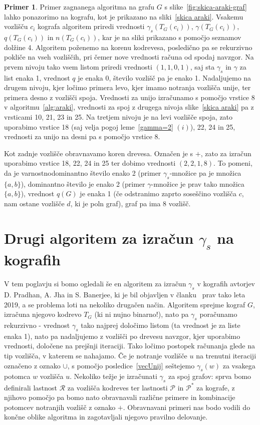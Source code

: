 \documentclass[12pt,a4paper,twoside]{article}
\theoremstyle{definition} %
\newtheorem{primer}[definicija]{Primer}
\theoremstyle{plain} %
\numberwithin{equation}{section}  %
\begin{document}
\begin{primer}
Primer zagnanega algoritma na grafu $G$ s slike~\ref{fig:skica-araki-graf} lahko ponazorimo na kografu, kot je prikazano na sliki~\ref{skica araki}. Vsakemu vozlišču $c_i$ kografa algoritem priredi vrednosti $\gamma_s(T_G(c_i))$, $\gamma(T_G(c_i))$, $q(T_G(c_i))$ in $n(T_G(c_i))$, kar je na sliki prikazano s pomočjo seznamov dolžine 4. Algoritem poženemo na korenu kodrevesa, posledično pa se rekurzivno pokliče na vseh vozliščih, pri čemer nove vrednosti računa od spodaj navzgor. Na prvem nivoju tako vsem listom priredi vrednosti $(1,1,0,1)$, saj sta $\gamma_s$ in $\gamma$ za list enaka 1, vrednost $q$ je enaka 0, število vozlišč pa je enako 1. Nadaljujemo na drugem nivoju, kjer ločimo primera levo, kjer imamo notranja vozlišča unije, ter primera desno z vozlišči spoja. Vrednosti za unijo izračunamo s pomočjo vrstice 8 v algoritmu~\ref{alg:araki}, vrednosti za spoj z drugega nivoja slike~\ref{skica araki} pa z vrsticami 10, 21, 23 in 25. Na tretjem nivoju je na levi vozlišče spoja, zato uporabimo vrstice 18 (saj velja pogoj leme~\ref{gamma=2} $(i)$), 22, 24 in 25, vrednosti za unijo na desni pa s pomočjo vrstice 8.

Kot zadnje vozlišče obravnavamo koren drevesa. Označen je s $+$, zato za izračun uporabimo vrstice 18, 22, 24 in 25 ter dobimo vrednosti $(2,2,1,8)$.  To pomeni, da je varnostnodominantno število enako 2 (primer $\gamma_s$-množice pa je množica $\{a, b\}$), dominantno število je enako 2 (primer $\gamma$-množice je prav tako množica $\{a, b\}$), vrednost $q(G)$ je enaka 1 (če odstranimo zaprto soseščino vozlišča $c$, nam ostane vozlišče $d$, ki je poln graf), graf pa ima 8 vozlišč.
\end{primer}

\pagebreak
\section{Drugi algoritem za izračun $\gamma_s$ na kografih}\label{sec:drugialgoritem}
V tem poglavju si bomo ogledali še en algoritem za izračun $\gamma_s$ v kografih avtorjev D. Pradhan, A. Jha in S. Banerjee, ki je bil objavljen v članku~\cite{jha2019secure} prav tako leta 2019, a se problema loti na nekoliko drugačen način. Algoritem sprejme kograf $G$, izračuna njegovo kodrevo $T_G$ (ki ni nujno binarno!), nato pa $\gamma_s$ poračunamo rekurzivno - vrednost $\gamma_s$ tako najprej določimo listom (ta vrednost je za liste enaka 1), nato pa nadaljujemo z vozlišči po drevesu navzgor, kjer uporabimo vrednosti, določene na prejšnji iteraciji. Tako ločimo postopek računanja glede na tip vozlišča, v katerem se nahajamo. Če je notranje vozlišče $u$ na trenutni iteraciji označeno z oznako $\cup$, s pomočjo posledice~\ref{vecUnij} seštejemo $\gamma_s(w)$ za vsakega potomca $w$ vozlišča $u$. Nekoliko težje je izračunati $\gamma_s$ za spoj grafov: sprva bomo definirali lastnost $\mathcal{R}$ za vozlišča kodreves ter lastnosti $\mathcal{P}$ in $\mathcal{P^*}$ za kografe, z njihovo pomočjo pa bomo nato obravnavali različne primere in kombinacije potomcev notranjih vozlišč z oznako $+$. Obravnavani primeri nas bodo vodili do končne oblike algoritma in zagotavljali njegovo pravilno delovanje.
\end{document}
